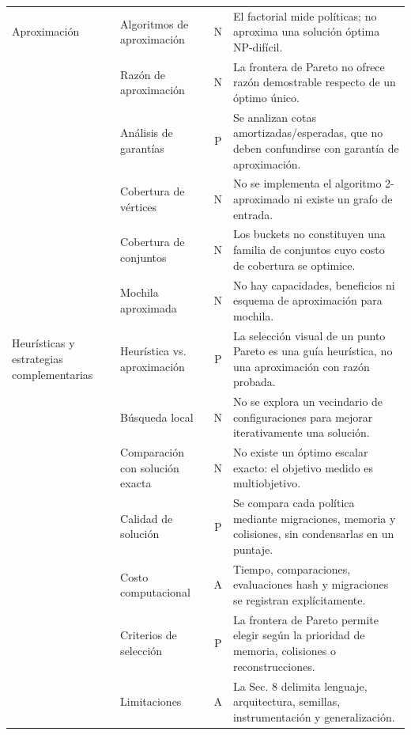 \begin{longtable}{p{2.7cm}p{3.4cm}c p{6.2cm}}
\midrule
Aproximación & Algoritmos de aproximación & N & El factorial mide políticas; no aproxima una solución óptima NP-difícil.\\
& Razón de aproximación & N & La frontera de Pareto no ofrece razón demostrable respecto de un óptimo único.\\
& Análisis de garantías & P & Se analizan cotas amortizadas/esperadas, que no deben confundirse con garantía de aproximación.\\
& Cobertura de vértices & N & No se implementa el algoritmo 2-aproximado ni existe un grafo de entrada.\\
& Cobertura de conjuntos & N & Los buckets no constituyen una familia de conjuntos cuyo costo de cobertura se optimice.\\
& Mochila aproximada & N & No hay capacidades, beneficios ni esquema de aproximación para mochila.\\
\midrule
Heurísticas y estrategias complementarias & Heurística vs. aproximación & P & La selección visual de un punto Pareto es una guía heurística, no una aproximación con razón probada.\\
& Búsqueda local & N & No se explora un vecindario de configuraciones para mejorar iterativamente una solución.\\
& Comparación con solución exacta & N & No existe un óptimo escalar exacto: el objetivo medido es multiobjetivo.\\
& Calidad de solución & P & Se compara cada política mediante migraciones, memoria y colisiones, sin condensarlas en un puntaje.\\
& Costo computacional & A & Tiempo, comparaciones, evaluaciones hash y migraciones se registran explícitamente.\\
& Criterios de selección & P & La frontera de Pareto permite elegir según la prioridad de memoria, colisiones o reconstrucciones.\\
& Limitaciones & A & La Sec. 8 delimita lenguaje, arquitectura, semillas, instrumentación y generalización.\\
\bottomrule
\end{longtable}
\normalsize
